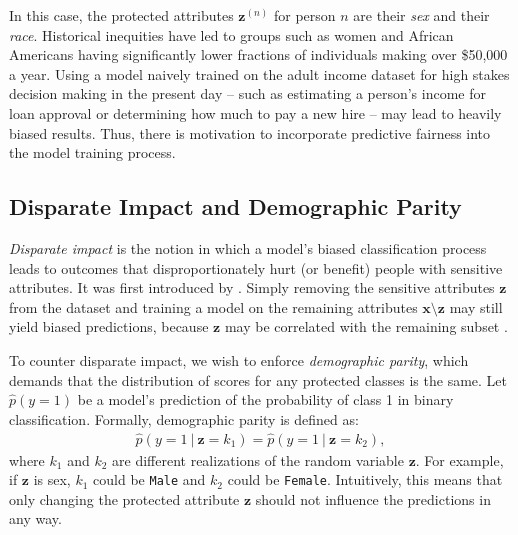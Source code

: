 \documentclass{article}
\newcommand\given[1][]{\:#1\vert\:}
\newcommand{\bd}[1]{\boldsymbol{#1}}
\newcommand{\hp}{\hat{p}}
\newcommand{\bidx}[3][]{\bd{#2}^{(#3)}_{#1}}
\begin{document}
In this case, the protected attributes $\bidx z n$ for person $n$ are their \emph{sex} and their \emph{race}.  Historical inequities have led to groups such as women and African Americans having significantly lower fractions of individuals making over \$50,000 a year.  Using a model naively trained on the adult income dataset for high stakes decision making in the present day -- such as estimating a person's income for loan approval or determining how much to pay a new hire -- may lead to heavily biased results.  Thus, there is motivation to incorporate predictive fairness into the model training process.

\subsection{Disparate Impact and Demographic Parity}   

\emph{Disparate impact} is the notion in which a model's biased classification process leads to outcomes that disproportionately hurt (or benefit) people with sensitive attributes.  It was first introduced by \citet{zafar2015fairness}.  Simply removing the sensitive attributes $\bd z$ from the dataset and training a model on the remaining attributes $\bd x \setminus \bd z$ may still yield biased predictions, because $\bd z$ may be correlated with the remaining subset \citep{agarwal2018reductions}.

To counter disparate impact, we wish to enforce \emph{demographic parity}, which demands that the distribution of scores for any protected classes is the same.  Let $\hat{p}(y = 1)$ be a model's prediction of the probability of class 1 in binary classification.  Formally, demographic parity is defined as:
\begin{align}
\hp(y = 1 \given \bd z = k_1) = \hp(y = 1 \given \bd z = k_2),
\end{align}  
where $k_1$ and $k_2$ are different realizations of the random variable $\bd z$.  For example, if $\bd z$ is sex, $k_1$ could be \texttt{Male} and $k_2$ could be \texttt{Female}.  Intuitively, this means that only changing the protected attribute $\bd z$ should not influence the predictions in any way.  
\end{document}
